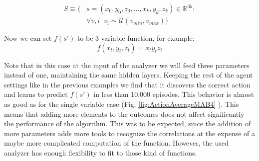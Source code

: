 \documentclass[11pt,a4paper,twoside]{report}
\newcommand{\+}{\textnormal{+} }
\theoremstyle{definition}
\numberwithin{equation}{chapter}
\begin{document}
    \begin{align}
      S\equiv\{&s=(x_0,y_0,z_0,...,x_k,y_k,z_k) \in \mathbb{R}^{3k}: \\
      & \forall v,i \; \; v_i \sim \mathcal{U}(v_{min},v_{max})
      \}
    \end{align}

    Now we can set $f(s')$ to be 3-variable function, for example:
    \begin{equation}
      f(x_t,y_t,z_t)=x_ty_tz_t
    \end{equation}

    Note that in this case at the input of the analyzer we will feed three
    parameters instead of one, maintaining the same hidden layers. Keeping the
    rest of the agent settings like in the previous examples we find that it
    discovers the correct action and learns to predict $f(s')$ in less than
    10,000 episodes. This behavior is almost as good as for the single variable
    case (Fig. \ref{fig:ActionAverageMAB4} ). This means that adding more
    elements to the outcomes does not affect significantly the performance of the
    algorithm. This was to be expected, since the addition of more parameters
    adds more tools to recognize the correlations at the expense of a maybe more
    complicated computation of the function. However, the used analyzer has
    enough flexibility to fit to those kind of functions.
\end{document}
